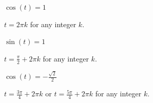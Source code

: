 \documentclass{ximera}
\begin{document}
\begin{question}
\begin{problem}
$\cos(t) = 1$

\begin{solution}

$t = 2\pi k$ for any integer $k$.

\end{solution}

\end{problem}

\begin{problem}
$\sin(t) = 1$

\begin{solution}
$t = \frac{\pi}{2} + 2\pi k$ for any integer $k$.
\end{solution}
\end{problem}

\begin{problem}\label{solvefortlast}
$\cos(t) = -\frac{\sqrt{2}}{2}$

\begin{solution}
$t = \frac{3\pi}{4} + 2\pi k$ or $t = \frac{5\pi}{4} + 2\pi k$ for any integer $k$.

\end{solution}

\end{problem}

\end{question}
\end{document}
